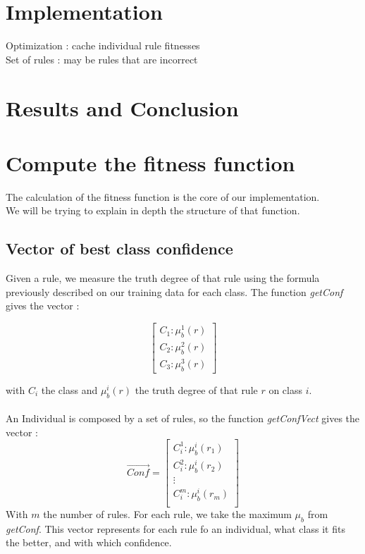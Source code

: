 \documentclass[a4paper,12pt]{article}
\begin{document}
\section{Implementation}

Optimization : cache individual rule fitnesses\\
Set of rules : may be rules that are incorrect 

\section{Results and Conclusion}




\section{Compute the fitness function}

The calculation of the fitness function is the core of our implementation.\\
We will be trying to explain in depth the structure of that function.

\subsection{Vector of best class confidence}

Given a rule, we measure the truth degree of that rule using the formula previously described on our training data for each class.
The function \textit{getConf} gives the vector :

\[
\begin{bmatrix}
C_1:\mu_b^1(r)\\
C_2:\mu_b^2(r)\\
C_3:\mu_b^3(r)
\end{bmatrix} \]

with $C_i$ the class and $\mu_b^i(r)$ the truth degree of that rule $r$ on class $i$.
\\
\\
An Individual is composed by a set of rules, so the function \textit{getConfVect} gives the vector :
\[
\vec{Conf}=
\begin{bmatrix}
C_i^1:\mu_b^i(r_1)\\
C_i^2:\mu_b^i(r_2)\\
\vdots\\
C_i^m:\mu_b^i(r_m)\\
\end{bmatrix} \]
With $m$ the number of rules. For each rule, we take the maximum $\mu_b$ from \textit{getConf}. This vector represents for each rule fo an individual, what class it fits the better, and with which confidence.
\end{document}
